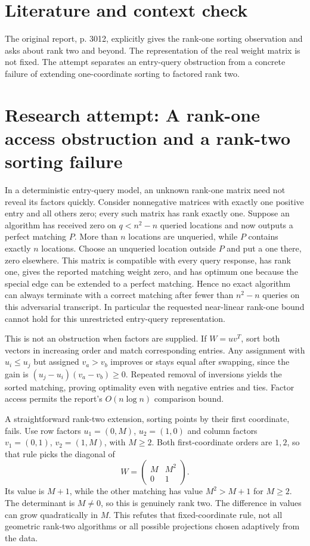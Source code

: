 \documentclass[11pt]{article}
\begin{document}
\section{Literature and context check}
The original report, p. 3012, explicitly gives the rank-one sorting observation and asks about rank two and beyond. The representation of the real weight matrix is not fixed. The attempt separates an entry-query obstruction from a concrete failure of extending one-coordinate sorting to factored rank two.
\section{Research attempt: A rank-one access obstruction and a rank-two sorting failure}
In a deterministic entry-query model, an unknown rank-one matrix need not reveal its factors quickly. Consider nonnegative matrices with exactly one positive entry and all others zero; every such matrix has rank exactly one. Suppose an algorithm has received zero on $q<n^2-n$ queried locations and now outputs a perfect matching $P$. More than $n$ locations are unqueried, while $P$ contains exactly $n$ locations. Choose an unqueried location outside $P$ and put a one there, zero elsewhere. This matrix is compatible with every query response, has rank one, gives the reported matching weight zero, and has optimum one because the special edge can be extended to a perfect matching. Hence no exact algorithm can always terminate with a correct matching after fewer than $n^2-n$ queries on this adversarial transcript. In particular the requested near-linear rank-one bound cannot hold for this unrestricted entry-query representation.

This is not an obstruction when factors are supplied. If $W=uv^T$, sort both vectors in increasing order and match corresponding entries. Any assignment with $u_i\le u_j$ but assigned $v_a>v_b$ improves or stays equal after swapping, since the gain is $(u_j-u_i)(v_a-v_b)\ge0$. Repeated removal of inversions yields the sorted matching, proving optimality even with negative entries and ties. Factor access permits the report's $O(n\log n)$ comparison bound.

A straightforward rank-two extension, sorting points by their first coordinate, fails. Use row factors $u_1=(0,M)$, $u_2=(1,0)$ and column factors $v_1=(0,1)$, $v_2=(1,M)$, with $M\ge2$. Both first-coordinate orders are $1,2$, so that rule picks the diagonal of
\[
W=\begin{pmatrix}M&M^2\\0&1\end{pmatrix}.
\]
Its value is $M+1$, while the other matching has value $M^2>M+1$ for $M\ge2$. The determinant is $M\ne0$, so this is genuinely rank two. The difference in values can grow quadratically in $M$. This refutes that fixed-coordinate rule, not all geometric rank-two algorithms or all possible projections chosen adaptively from the data.
\end{document}
